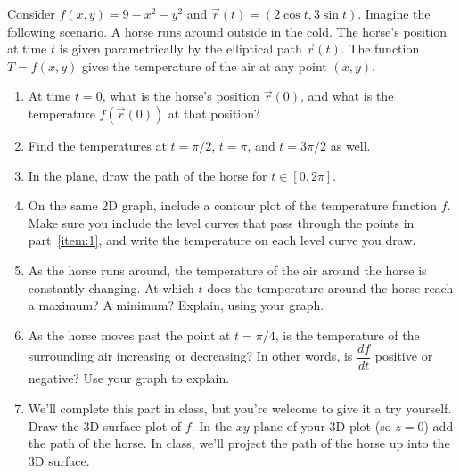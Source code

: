 \begin{problem}\label{prob:horse track chain}
 Consider $f(x,y)=9-x^2-y^2$ and $\vec r(t)=(2\cos t, 3\sin t)$. Imagine the following scenario.  A horse runs around outside in the cold. The horse's position at time $t$ is given parametrically by the elliptical path $\vec r(t)$. The function $T=f(x,y)$ gives the temperature of the air at any point $(x,y)$.  
\begin{enumerate}
	\item\label{item:1} At time $t=0$, what is the horse's position $\vec r(0)$, and what is the temperature $f(\vec r(0))$ at that position? 
	\item Find the temperatures at $t=\pi/2$, $t=\pi$, and $t=3\pi/2$ as well. 
	\item In the plane, draw the path of the horse for $t\in [0,2\pi]$. 
	\item On the same 2D graph, include a contour plot of the temperature function $f$. Make sure you include the level curves that pass through the points in part~\ref{item:1}, and write the temperature on each level curve you draw. 
	
 \item As the horse runs around, the temperature of the air around the horse is constantly changing. 
At which $t$ does the temperature around the horse reach a maximum?  A minimum?  Explain, using your graph. 
%
 \item\label{item:2} As the horse moves past the point at $t=\pi/4$, is the temperature of the surrounding air increasing or decreasing? In other words, is $\dfrac{df}{dt}$ positive or negative? Use your graph to explain.
 \item We'll complete this part in class, but you're welcome to give it a try yourself. %
Draw the 3D surface plot of $f$. In the $xy$-plane of your 3D plot (so $z=0$) add the path of the horse. In class, we'll project the path of the horse up into the 3D surface. 
\end{enumerate}
\end{problem}

